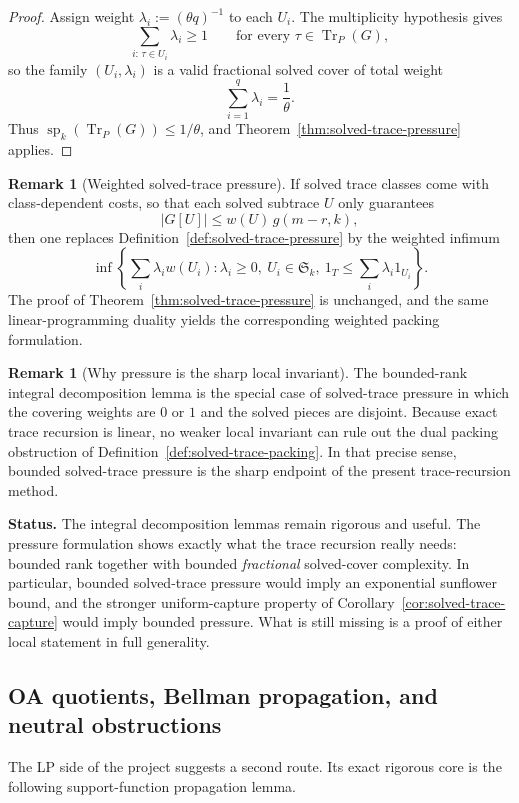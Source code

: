 \documentclass[11pt]{article}
\theoremstyle{definition}
\newtheorem{remark}[theorem]{Remark}
\newcommand{\Tr}{\operatorname{Tr}}
\newcommand{\1}{\mathbf{1}}
\newcommand{\status}[1]{\par\smallskip\noindent\textbf{Status.} #1\par\smallskip}
\begin{document}
\begin{proof}
Assign weight $\lambda_i:=(\theta q)^{-1}$ to each $U_i$. The multiplicity hypothesis gives
\[
\sum_{i:\,\tau\in U_i}\lambda_i\ge 1
\qquad\text{for every }\tau\in \Tr_P(G),
\]
so the family $(U_i,\lambda_i)$ is a valid fractional solved cover of total weight
\[
\sum_{i=1}^q \lambda_i = \frac{1}{\theta}.
\]
Thus $\operatorname{sp}_k(\Tr_P(G))\le 1/\theta$, and Theorem~\ref{thm:solved-trace-pressure} applies.
\end{proof}



\begin{remark}[Weighted solved-trace pressure]\label{rem:weighted-solved-trace-pressure}
If solved trace classes come with class-dependent costs, so that each solved subtrace $U$ only guarantees
\[
|G[U]|\le w(U)\,g(m-r,k),
\]
then one replaces Definition~\ref{def:solved-trace-pressure} by the weighted infimum
\[
\inf\left\{
\sum_i \lambda_i w(U_i):
\lambda_i\ge 0,\ U_i\in \mathfrak S_k,\ 1_T\le \sum_i \lambda_i 1_{U_i}
\right\}.
\]
The proof of Theorem~\ref{thm:solved-trace-pressure} is unchanged, and the same linear-programming duality yields the corresponding weighted packing formulation.
\end{remark}


\begin{remark}[Why pressure is the sharp local invariant]
The bounded-rank integral decomposition lemma is the special case of solved-trace pressure in which the covering weights are $0$ or $1$ and the solved pieces are disjoint. Because exact trace recursion is linear, no weaker local invariant can rule out the dual packing obstruction of Definition~\ref{def:solved-trace-packing}. In that precise sense, bounded solved-trace pressure is the sharp endpoint of the present trace-recursion method.
\end{remark}

\status{The integral decomposition lemmas remain rigorous and useful. The pressure formulation shows exactly what the trace recursion really needs: bounded rank together with bounded \emph{fractional} solved-cover complexity. In particular, bounded solved-trace pressure would imply an exponential sunflower bound, and the stronger uniform-capture property of Corollary~\ref{cor:solved-trace-capture} would imply bounded pressure. What is still missing is a proof of either local statement in full generality.}


\subsection*{OA quotients, Bellman propagation, and neutral obstructions}
The LP side of the project suggests a second route. Its exact rigorous core is the following support-function propagation lemma.
\end{document}
